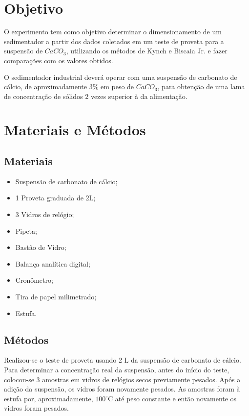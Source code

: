 \chapter{Objetivo}


O experimento tem como objetivo determinar o dimensionamento de um sedimentador a partir dos dados coletados em um teste de proveta para a suspensão de $ CaCO_{3} $, utilizando os métodos de Kynch e Biscaia Jr. e fazer comparações com os valores obtidos.

O sedimentador industrial deverá operar com uma suspensão de carbonato de cálcio, de aproximadamente 3\% em peso de $ CaCO_{3} $, para obtenção de uma lama de concentração de sólidos 2 vezes superior à da alimentação.
\\


\chapter{Materiais e Métodos}

\section{Materiais}

\begin{itemize}
\item Suspensão de carbonato de cálcio;
\item 1 Proveta graduada de 2L;
\item 3 Vidros de relógio;
\item Pipeta;
\item Bastão de Vidro;
\item Balança analítica digital;
\item Cronômetro;
\item Tira de papel milimetrado;
\item Estufa.
\end{itemize}

\section{Métodos}

Realizou-se o teste de proveta usando 2 L da suspensão de carbonato de cálcio. Para determinar a concentração real da suspensão, antes do início do teste, colocou-se 3 amostras em vidros de relógios secos previamente pesados. Após a adição da suspensão, os vidros foram novamente pesados. As amostras foram à estufa por, aproximadamente, $ 100^{\circ} $C até peso constante e então novamente os vidros foram pesados.


